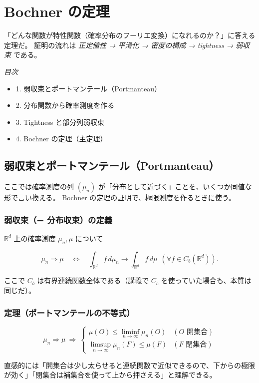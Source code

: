 \documentclass[uplatex,dvipdfmx,11pt,a4paper,openany]{bxjsbook}
\begin{document}
\chapter{Bochner の定理}
「どんな関数が特性関数（確率分布のフーリエ変換）になれるのか？」に答える定理だ。
        証明の流れは \emph{正定値性 → 平滑化 → 密度の構成 → tightness → 弱収束} である。

\emph{目次}

\begin{itemize}
\item 1. 弱収束とポートマンテール（Portmanteau）
\item 2. 分布関数から確率測度を作る
\item 3. Tightness と部分列弱収束
\item 4. Bochner の定理（主定理）
\end{itemize}

\section{弱収束とポートマンテール（Portmanteau）}
ここでは確率測度の列 $(\mu_n)$ が「分布として近づく」ことを、いくつか同値な形で言い換える。
        Bochner の定理の証明で、極限測度を作るときに使う。

\subsection{弱収束（= 分布収束）の定義}
$\mathbb R^d$ 上の確率測度 $\mu_n,\mu$ について

\[\mu_n \Rightarrow \mu
        \quad\Longleftrightarrow\quad
        \int_{\mathbb R^d} f\,d\mu_n \to \int_{\mathbb R^d} f\,d\mu
        \ \ (\forall f\in C_b(\mathbb R^d)).\]

ここで $C_b$ は有界連続関数全体である（講義で $C_c$ を使っていた場合も、本質は同じだ）。

\subsection{定理（ポートマンテールの不等式）}
\[\mu_n\Rightarrow\mu
        \ \Rightarrow\
        \begin{cases}
          \mu(O)\le \liminf_{n\to\infty}\mu_n(O) & (\text{$O$ 開集合})\\[4pt]
          \limsup_{n\to\infty}\mu_n(F)\le \mu(F) & (\text{$F$ 閉集合})
        \end{cases}\]

直感的には「開集合は少し太らせると連続関数で近似できるので、下からの極限が効く」「閉集合は補集合を使って上から押さえる」と理解できる。
\end{document}
